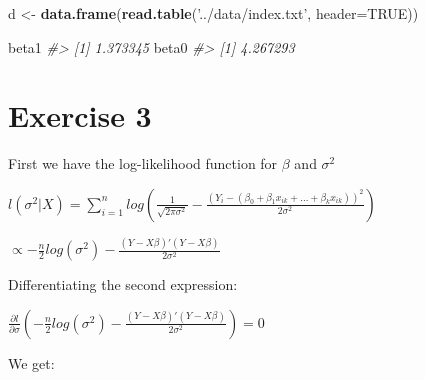 \documentclass[]{article}
\newenvironment{Shaded}{\begin{snugshade}}{\end{snugshade}}
\newcommand{\CommentTok}[1]{\textcolor[rgb]{0.56,0.35,0.01}{\textit{#1}}}
\newcommand{\DataTypeTok}[1]{\textcolor[rgb]{0.13,0.29,0.53}{#1}}
\newcommand{\KeywordTok}[1]{\textcolor[rgb]{0.13,0.29,0.53}{\textbf{#1}}}
\newcommand{\NormalTok}[1]{#1}
\newcommand{\OperatorTok}[1]{\textcolor[rgb]{0.81,0.36,0.00}{\textbf{#1}}}
\newcommand{\OtherTok}[1]{\textcolor[rgb]{0.56,0.35,0.01}{#1}}
\newcommand{\StringTok}[1]{\textcolor[rgb]{0.31,0.60,0.02}{#1}}
\begin{document}
\begin{Shaded}
\begin{Highlighting}[]
\NormalTok{d <-}\StringTok{ }\KeywordTok{data.frame}\NormalTok{(}\KeywordTok{read.table}\NormalTok{(}\StringTok{'../data/index.txt'}\NormalTok{, }\DataTypeTok{header=}\OtherTok{TRUE}\NormalTok{))}
\end{Highlighting}
\end{Shaded}

\begin{Shaded}
\end{Shaded}

\begin{Shaded}
\begin{Highlighting}[]
\NormalTok{beta1}
\CommentTok{#> [1] 1.373345}
\NormalTok{beta0}
\CommentTok{#> [1] 4.267293}
\end{Highlighting}
\end{Shaded}

\newpage

\hypertarget{exercise-3}{%
\section{Exercise 3}\label{exercise-3}}

First we have the log-likelihood function for \(\beta\) and
\(\sigma^{2}\)

\(l(\sigma^{2} | X) = \sum_{i=1}^n log(\frac{1}{\sqrt{2 \pi \sigma^{2}}} - \frac{(Y_{i} - (\beta_{0} + \beta_{1} x_{ik} + \dots + \beta_{k} x_{ik}))^{2}}{2 \sigma^{2}})\)

\(\propto - \frac{n}{2} log(\sigma^{2}) - \frac{(Y - X \beta) \prime (Y - X \beta)}{2 \sigma^{2}}\)

Differentiating the second expression:

\(\frac{\partial l}{\partial \sigma} ( - \frac{n}{2} log(\sigma^{2}) - \frac{(Y - X \beta) \prime (Y - X \beta)}{2 \sigma^{2}}) = 0\)

We get:
\end{document}
